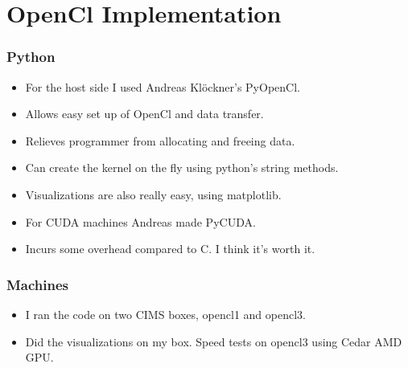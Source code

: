 \documentclass[]{beamer}
\begin{document}
\section{OpenCl Implementation}
\begin{frame}
  \frametitle{Python}   %

  \begin{itemize}
  \item For the host side I used Andreas Kl\"ockner's PyOpenCl.
  \item Allows easy set up of OpenCl and data transfer.
  \item Relieves programmer from allocating and freeing data.
  \item Can create the kernel on the fly using python's string methods.
  \item Visualizations are also really easy, using matplotlib.
  \item For CUDA machines Andreas made PyCUDA.
  \item Incurs some overhead compared to C. I think it's worth it.
  \end{itemize}
\end{frame}

\begin{frame}
  \frametitle{Machines}   %

  \begin{itemize}
  \item I ran the code on two CIMS boxes, opencl1 and opencl3. 
  \item Did the visualizations on my box. Speed tests on opencl3 using Cedar AMD GPU. 
  \end{itemize}
\end{frame}
\end{document}
